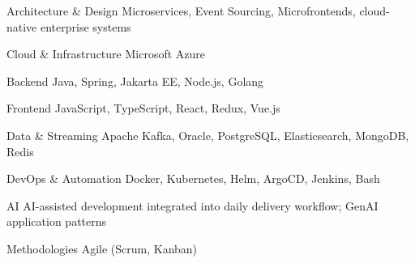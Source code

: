 

\begin{cvskills}

  \cvskill
    {Architecture \& Design} %
    {Microservices, Event Sourcing, Microfrontends, cloud-native enterprise systems} %

  \cvskill
    {Cloud \& Infrastructure} %
    {Microsoft Azure} %

  \cvskill
    {Backend} %
    {Java, Spring, Jakarta EE, Node.js, Golang} %

  \cvskill
    {Frontend} %
    {JavaScript, TypeScript, React, Redux, Vue.js} %

  \cvskill
    {Data \& Streaming} %
    {Apache Kafka, Oracle, PostgreSQL, Elasticsearch, MongoDB, Redis} %

  \cvskill
    {DevOps \& Automation} %
    {Docker, Kubernetes, Helm, ArgoCD, Jenkins, Bash} %

  \cvskill
    {AI} %
    {AI-assisted development integrated into daily delivery workflow; GenAI application patterns} %

  \cvskill
    {Methodologies} %
    {Agile (Scrum, Kanban)} %

\end{cvskills}
